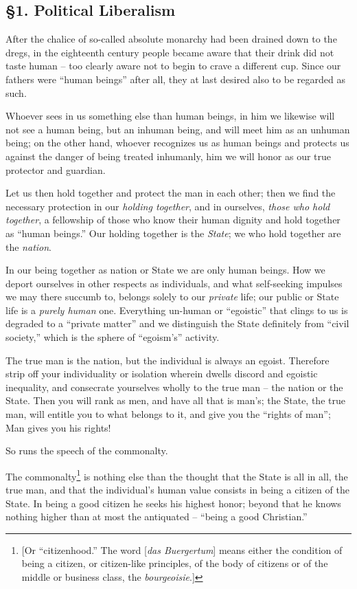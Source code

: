 \subsection[\S{}1. Political Liberalism]{\centering \S{}1. Political Liberalism}

After the chalice of so-called absolute monarchy had been drained down to the 
dregs, in the eighteenth century people became aware that their drink did not 
taste human -- too clearly aware not to begin to crave a different cup. Since 
our fathers were ``human beings'' after all, they at last desired also to be 
regarded as such.

Whoever sees in us something else than human beings, in him we likewise will 
not see a human being, but an inhuman being, and will meet him as an unhuman 
being; on the other hand, whoever recognizes us as human beings and protects 
us against the danger of being treated inhumanly, him we will honor as our 
true protector and guardian.

Let us then hold together and protect the man in each other; then we find the 
necessary protection in our \textit{holding together}, and in ourselves, 
\textit{those who hold together}, a fellowship of those who know their human 
dignity and hold together as ``human beings.'' Our holding together is the 
\textit{State}; we who hold together are the \textit{nation}.

In our being together as nation or State we are only human beings. How we 
deport ourselves in other respects as individuals, and what self-seeking 
impulses we may there succumb to, belongs solely to our \textit{private} life; 
our public or State life is a \textit{purely human} one. Everything un-human 
or ``egoistic'' that clings to us is degraded to a ``private matter'' and 
we distinguish the State definitely from ``civil society,'' which is the 
sphere of ``egoism's'' activity.

The true man is the nation, but the individual is always an egoist. Therefore 
strip off your individuality or isolation wherein dwells discord and egoistic 
inequality, and consecrate yourselves wholly to the true man -- the nation or 
the State. Then you will rank as men, and have all that is man's; the State, 
the true man, will entitle you to what belongs to it, and give you the 
``rights of man''; Man gives you his rights!

So runs the speech of the commonalty.

The commonalty\footnote{[Or ``citizenhood.'' The word [\textit{das 
Buergertum}] means either the condition of being a citizen, or citizen-like 
principles, of the body of citizens or of the middle or business class, the 
\textit{bourgeoisie}.]} is nothing else than the thought that the State is all 
in all, the true man, and that the individual's human value consists in being 
a citizen of the State. In being a good citizen he seeks his highest honor; 
beyond that he knows nothing higher than at most the antiquated -- ``being a 
good Christian.''

